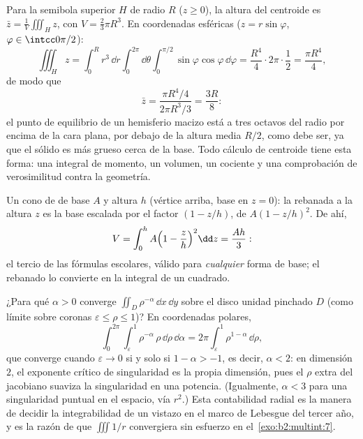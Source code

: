\begin{example}\label{ex:b2:multint:centroid}
Para la semibola superior $H$ de radio $R$ ($z \geq 0$), la altura
del centroide es $\bar z = \frac1{V}\iiint_H z$, con $V = \frac23\pi
R^3$. En coordenadas esféricas ($z = r\sin\varphi$, $\varphi \in
\intcc0{\pi/2}$):
\[
\iiint_H z
= \int_0^R r^3\,\dd r\int_0^{2\pi}\dd\theta
\int_0^{\pi/2}\sin\varphi\cos\varphi\,\dd\varphi
= \frac{R^4}4\cdot2\pi\cdot\frac12 = \frac{\pi R^4}4 ,
\]
de modo que
\[
\bar z = \frac{\pi R^4/4}{2\pi R^3/3} = \frac{3R}8 :
\]
el punto de equilibrio de un hemisferio macizo está a tres octavos
del radio por encima de la cara plana, por debajo de la altura media
$R/2$, como debe ser, ya que el sólido es más grueso cerca de la
base. Todo cálculo de centroide tiene esta forma: una integral de
momento, un volumen, un cociente y una comprobación de
verosimilitud contra la geometría.
\end{example}

\begin{example}\label{ex:b2:multint:cone}
Un cono de  de base $A$ y altura $h$ (vértice arriba, base en $z
= 0$): la rebanada a la altura $z$ es la base escalada por el factor
$(1 - z/h)$, de  $A(1 - z/h)^2$. De ahí,
\[
V = \int_0^h A\Bigl(1 - \frac zh\Bigr)^2\dd z = \frac{Ah}{3} :
\]
el tercio de las fórmulas escolares, válido para \emph{cualquier}
forma de base; el rebanado lo convierte en la integral de un
cuadrado.
\end{example}

\begin{example}\label{ex:b2:multint:threshold}
¿Para qué $\alpha > 0$ converge $\iint_{D}\rho^{-\alpha}\,\dd x\,\dd
y$ sobre el disco unidad pinchado $D$ (como límite sobre coronas
$\varepsilon \leq \rho \leq 1$)? En coordenadas polares,
\[
\int_0^{2\pi}\!\!\int_\varepsilon^1\rho^{-\alpha}\,
\rho\,\dd\rho\,\dd\alpha
= 2\pi\int_\varepsilon^1\rho^{1-\alpha}\,\dd\rho ,
\]
que converge cuando $\varepsilon \to 0$ si y solo si $1 - \alpha >
-1$, es decir, $\alpha < 2$: en dimensión $2$, el exponente crítico
de singularidad es la propia dimensión, pues el $\rho$ extra del
jacobiano suaviza la singularidad en una potencia. (Igualmente,
$\alpha < 3$ para una singularidad puntual en el espacio, vía $r^2$.)
Esta contabilidad radial es la manera de decidir la integrabilidad de
un vistazo en el marco de Lebesgue del tercer año, y es la razón de
que $\iiint 1/r$ convergiera sin esfuerzo en el~\cref{exo:b2:multint:7}.
\end{example}


